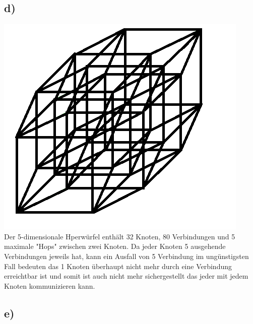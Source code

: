 \documentclass[a4paper,12pt]{scrartcl}
\begin{document}
\subsection{d)}
\includegraphics{./images/Blatt-4-Aufgabe17d}\\
Der 5-dimensionale Hperwürfel enthält 32 Knoten, 80 Verbindungen und 5 maximale "Hops" zwischen zwei Knoten. Da jeder Knoten 5 ausgehende Verbindungen jeweils hat, kann ein Ausfall von 5 Verbindung im ungünstigsten Fall bedeuten das 1 Knoten überhaupt nicht mehr durch eine Verbindung erreichtbar ist und somit ist auch nicht mehr sichergestellt das jeder mit jedem Knoten kommunizieren kann.
\subsection{e)}
\end{document}

